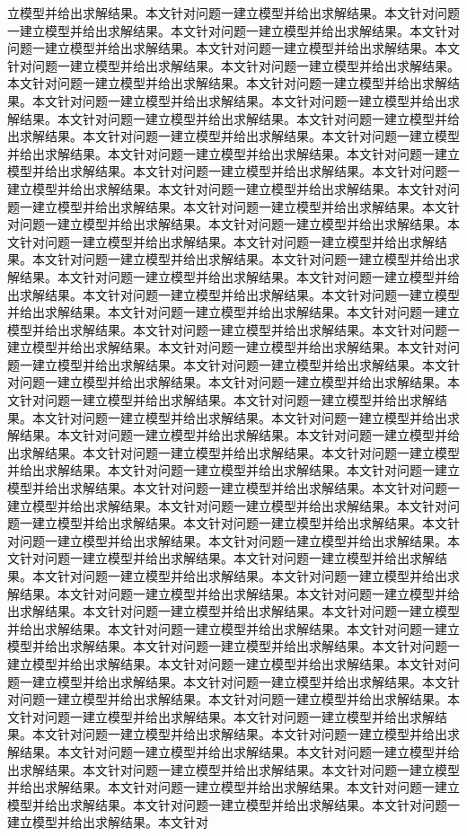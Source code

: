 立模型并给出求解结果。本文针对问题一建立模型并给出求解结果。本文针对问题一建立模型并给出求解结果。本文针对问题一建立模型并给出求解结果。本文针对问题一建立模型并给出求解结果。本文针对问题一建立模型并给出求解结果。本文针对问题一建立模型并给出求解结果。本文针对问题一建立模型并给出求解结果。本文针对问题一建立模型并给出求解结果。本文针对问题一建立模型并给出求解结果。本文针对问题一建立模型并给出求解结果。本文针对问题一建立模型并给出求解结果。本文针对问题一建立模型并给出求解结果。本文针对问题一建立模型并给出求解结果。本文针对问题一建立模型并给出求解结果。本文针对问题一建立模型并给出求解结果。本文针对问题一建立模型并给出求解结果。本文针对问题一建立模型并给出求解结果。本文针对问题一建立模型并给出求解结果。本文针对问题一建立模型并给出求解结果。本文针对问题一建立模型并给出求解结果。本文针对问题一建立模型并给出求解结果。本文针对问题一建立模型并给出求解结果。本文针对问题一建立模型并给出求解结果。本文针对问题一建立模型并给出求解结果。本文针对问题一建立模型并给出求解结果。本文针对问题一建立模型并给出求解结果。本文针对问题一建立模型并给出求解结果。本文针对问题一建立模型并给出求解结果。本文针对问题一建立模型并给出求解结果。本文针对问题一建立模型并给出求解结果。本文针对问题一建立模型并给出求解结果。本文针对问题一建立模型并给出求解结果。本文针对问题一建立模型并给出求解结果。本文针对问题一建立模型并给出求解结果。本文针对问题一建立模型并给出求解结果。本文针对问题一建立模型并给出求解结果。本文针对问题一建立模型并给出求解结果。本文针对问题一建立模型并给出求解结果。本文针对问题一建立模型并给出求解结果。本文针对问题一建立模型并给出求解结果。本文针对问题一建立模型并给出求解结果。本文针对问题一建立模型并给出求解结果。本文针对问题一建立模型并给出求解结果。本文针对问题一建立模型并给出求解结果。本文针对问题一建立模型并给出求解结果。本文针对问题一建立模型并给出求解结果。本文针对问题一建立模型并给出求解结果。本文针对问题一建立模型并给出求解结果。本文针对问题一建立模型并给出求解结果。本文针对问题一建立模型并给出求解结果。本文针对问题一建立模型并给出求解结果。本文针对问题一建立模型并给出求解结果。本文针对问题一建立模型并给出求解结果。本文针对问题一建立模型并给出求解结果。本文针对问题一建立模型并给出求解结果。本文针对问题一建立模型并给出求解结果。本文针对问题一建立模型并给出求解结果。本文针对问题一建立模型并给出求解结果。本文针对问题一建立模型并给出求解结果。本文针对问题一建立模型并给出求解结果。本文针对问题一建立模型并给出求解结果。本文针对问题一建立模型并给出求解结果。本文针对问题一建立模型并给出求解结果。本文针对问题一建立模型并给出求解结果。本文针对问题一建立模型并给出求解结果。本文针对问题一建立模型并给出求解结果。本文针对问题一建立模型并给出求解结果。本文针对问题一建立模型并给出求解结果。本文针对问题一建立模型并给出求解结果。本文针对问题一建立模型并给出求解结果。本文针对问题一建立模型并给出求解结果。本文针对问题一建立模型并给出求解结果。本文针对问题一建立模型并给出求解结果。本文针对问题一建立模型并给出求解结果。本文针对问题一建立模型并给出求解结果。本文针对问题一建立模型并给出求解结果。本文针对问题一建立模型并给出求解结果。本文针对问题一建立模型并给出求解结果。本文针对问题一建立模型并给出求解结果。本文针对问题一建立模型并给出求解结果。本文针对问题一建立模型并给出求解结果。本文针对问题一建立模型并给出求解结果。本文针对问题一建立模型并给出求解结果。本文针对问题一建立模型并给出求解结果。本文针对问题一建立模型并给出求解结果。本文针对问题一建立模型并给出求解结果。本文针对问题一建立模型并给出求解结果。本文针对